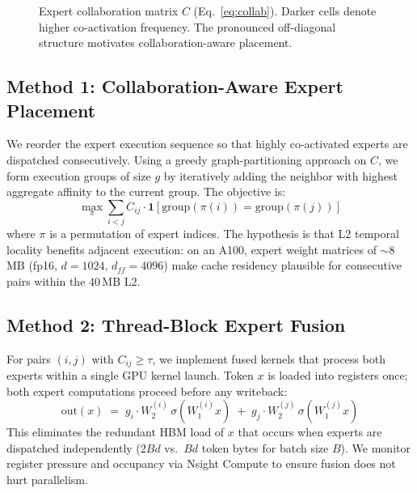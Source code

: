 \documentclass{article}
\begin{document}
\begin{figure}[h]
\centering
\caption{Expert collaboration matrix $C$ (Eq.~\ref{eq:collab}). Darker cells denote
higher co-activation frequency. The pronounced off-diagonal structure motivates
collaboration-aware placement.}
\label{fig:heatmap}
\end{figure}
 
\subsection{Method 1: Collaboration-Aware Expert Placement}
 
We reorder the expert execution sequence so that highly co-activated experts are
dispatched consecutively.
Using a greedy graph-partitioning approach on $C$, we form execution groups of size
$g$ by iteratively adding the neighbor with highest aggregate affinity to the current
group.
The objective is:
\begin{equation}
    \max_{\pi} \sum_{i < j} C_{ij} \cdot
    \mathbf{1}\!\left[\mathrm{group}(\pi(i)) = \mathrm{group}(\pi(j))\right]
\end{equation}
where $\pi$ is a permutation of expert indices.
The hypothesis is that L2 temporal locality benefits adjacent execution: on an A100,
expert weight matrices of $\sim$8\,MB (fp16, $d\!=\!1024$, $d_{ff}\!=\!4096$) make
cache residency plausible for consecutive pairs within the 40\,MB L2.
 
\subsection{Method 2: Thread-Block Expert Fusion}
 
For pairs $(i,j)$ with $C_{ij} \geq \tau$, we implement fused kernels that process
both experts within a single GPU kernel launch.
Token $x$ is loaded into registers once; both expert computations proceed before any
writeback:
\begin{equation}
    \mathrm{out}(x) \;=\;
        g_i \cdot W_2^{(i)}\,\sigma\!\left(W_1^{(i)} x\right)
        \;+\;
        g_j \cdot W_2^{(j)}\,\sigma\!\left(W_1^{(j)} x\right)
\end{equation}
This eliminates the redundant HBM load of $x$ that occurs when experts are dispatched
independently ($2Bd$ vs.\ $Bd$ token bytes for batch size $B$).
We monitor register pressure and occupancy via Nsight Compute to ensure fusion does
not hurt parallelism.
 
\end{document}
